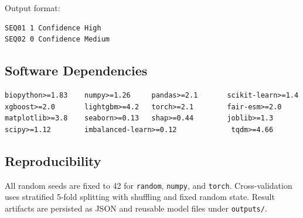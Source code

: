 \documentclass[11pt,a4paper]{article}
\begin{document}
Output format:
\begin{verbatim}
SEQ01 1 Confidence High
SEQ02 0 Confidence Medium
\end{verbatim}

\subsection{Software Dependencies}
\begin{verbatim}
biopython>=1.83    numpy>=1.26     pandas>=2.1       scikit-learn>=1.4
xgboost>=2.0       lightgbm>=4.2   torch>=2.1        fair-esm>=2.0
matplotlib>=3.8    seaborn>=0.13   shap>=0.44        joblib>=1.3
scipy>=1.12        imbalanced-learn>=0.12             tqdm>=4.66
\end{verbatim}

\subsection{Reproducibility}
All random seeds are fixed to 42 for \texttt{random}, \texttt{numpy}, and \texttt{torch}.
Cross-validation uses stratified 5-fold splitting with shuffling and fixed random state.
Result artifacts are persisted as JSON and reusable model files under \texttt{outputs/}.
\end{document}
